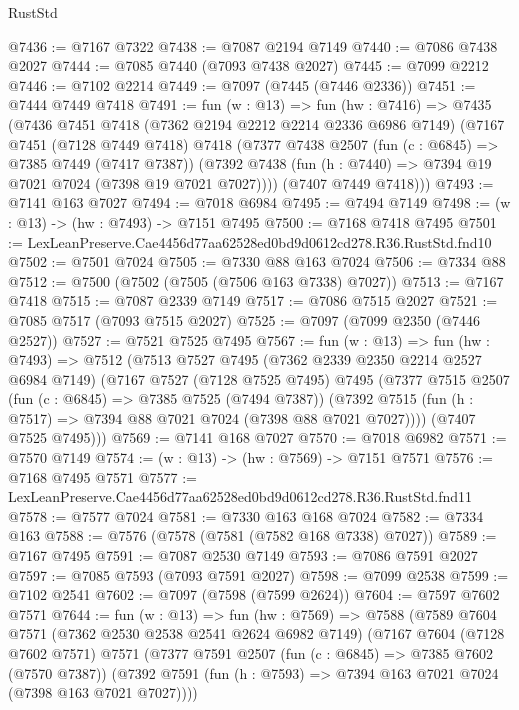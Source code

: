 \begin{lexlean}{RustStd}
\begin{coremodule}
@7436 := @7167 @7322
@7438 := @7087 @2194 @7149
@7440 := @7086 @7438 @2027
@7444 := @7085 @7440 (@7093 @7438 @2027)
@7445 := @7099 @2212
@7446 := @7102 @2214
@7449 := @7097 (@7445 (@7446 @2336))
@7451 := @7444 @7449 @7418
@7491 := fun (w : @13) =>
  fun (hw : @7416) =>
  @7435
    (@7436
      @7451
      @7418
      (@7362 @2194 @2212 @2214 @2336 @6986 @7149)
      (@7167
        @7451
        (@7128 @7449 @7418)
        @7418
        (@7377
          @7438
          @2507
          (fun (c : @6845) => @7385 @7449 (@7417 @7387))
          (@7392 @7438 (fun (h : @7440) => @7394 @19 @7021 @7024 (@7398 @19 @7021 @7027))))
        (@7407 @7449 @7418)))
@7493 := @7141 @163 @7027
@7494 := @7018 @6984
@7495 := @7494 @7149
@7498 := (w : @13) -> (hw : @7493) -> @7151 @7495
@7500 := @7168 @7418 @7495
@7501 := LexLeanPreserve.Cae4456d77aa62528ed0bd9d0612cd278.R36.RustStd.fnd10
@7502 := @7501 @7024
@7505 := @7330 @88 @163 @7024
@7506 := @7334 @88
@7512 := @7500 (@7502 (@7505 (@7506 @163 @7338) @7027))
@7513 := @7167 @7418
@7515 := @7087 @2339 @7149
@7517 := @7086 @7515 @2027
@7521 := @7085 @7517 (@7093 @7515 @2027)
@7525 := @7097 (@7099 @2350 (@7446 @2527))
@7527 := @7521 @7525 @7495
@7567 := fun (w : @13) =>
  fun (hw : @7493) =>
  @7512
    (@7513
      @7527
      @7495
      (@7362 @2339 @2350 @2214 @2527 @6984 @7149)
      (@7167
        @7527
        (@7128 @7525 @7495)
        @7495
        (@7377
          @7515
          @2507
          (fun (c : @6845) => @7385 @7525 (@7494 @7387))
          (@7392 @7515 (fun (h : @7517) => @7394 @88 @7021 @7024 (@7398 @88 @7021 @7027))))
        (@7407 @7525 @7495)))
@7569 := @7141 @168 @7027
@7570 := @7018 @6982
@7571 := @7570 @7149
@7574 := (w : @13) -> (hw : @7569) -> @7151 @7571
@7576 := @7168 @7495 @7571
@7577 := LexLeanPreserve.Cae4456d77aa62528ed0bd9d0612cd278.R36.RustStd.fnd11
@7578 := @7577 @7024
@7581 := @7330 @163 @168 @7024
@7582 := @7334 @163
@7588 := @7576 (@7578 (@7581 (@7582 @168 @7338) @7027))
@7589 := @7167 @7495
@7591 := @7087 @2530 @7149
@7593 := @7086 @7591 @2027
@7597 := @7085 @7593 (@7093 @7591 @2027)
@7598 := @7099 @2538
@7599 := @7102 @2541
@7602 := @7097 (@7598 (@7599 @2624))
@7604 := @7597 @7602 @7571
@7644 := fun (w : @13) =>
  fun (hw : @7569) =>
  @7588
    (@7589
      @7604
      @7571
      (@7362 @2530 @2538 @2541 @2624 @6982 @7149)
      (@7167
        @7604
        (@7128 @7602 @7571)
        @7571
        (@7377
          @7591
          @2507
          (fun (c : @6845) => @7385 @7602 (@7570 @7387))
          (@7392 @7591 (fun (h : @7593) => @7394 @163 @7021 @7024 (@7398 @163 @7021 @7027))))

\end{coremodule}
\end{lexlean}
